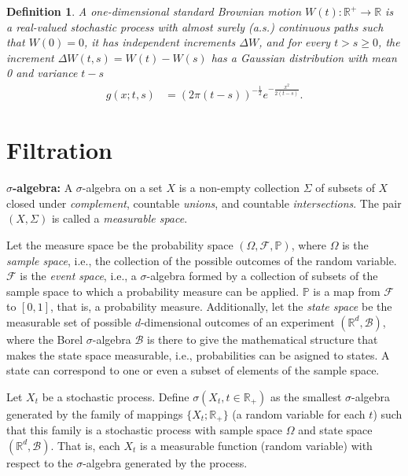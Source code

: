 \documentclass[11pt]{article}
\newtheorem{definition}{Definition}[section]
\begin{document}
\begin{definition}
  A one-dimensional standard {\it Brownian motion} $W(t):\mathbb{R}^+\rightarrow\mathbb{R}$ is a real-valued stochastic process with almost surely (a.s.) continuous paths such that $W(0)=0$, it has independent increments $\Delta W$, and for every $t>s\geq0$, the increment $\Delta W(t,s)=W(t)-W(s)$ has a Gaussian distribution with mean 0 and variance $t-s$
  \begin{align}
    g(x;t,s)&=\left(2\pi(t-s)\right)^{-\frac{1}{2}}e^{-\frac{x^2}{2(t-s)}}.
  \end{align}
\end{definition}


\section{Filtration}
{\bf $\sigma$-algebra:} A $\sigma$-algebra on a set $X$ is a non-empty collection $\Sigma$ of subsets of $X$ closed under {\it complement}, countable {\it unions}, and countable {\it intersections}. The pair $(X,\Sigma)$ is called a {\it measurable space}.

Let the measure space be the probability space $(\Omega,\mathcal{F},\mathbb{P})$, where $\Omega$ is the {\it sample space}, i.e., the collection of the possible outcomes of the random variable. $\mathcal{F}$ is the {\it event space}, i.e., a $\sigma$-algebra formed by a collection of subsets of the sample space to which a probability measure can be applied. $\mathbb{P}$ is a map from $\mathcal{F}$ to $[0,1]$, that is, a probability measure. Additionally, let the {\it state space} be the measurable set of possible $d$-dimensional outcomes of an experiment $(\mathbb{R}^d,\mathcal{B})$, where the Borel $\sigma$-algebra $\mathcal{B}$ is there to give the mathematical structure that makes the state space measurable, i.e., probabilities can be asigned to states. A state can correspond to one or even a subset of elements of the sample space.

Let $X_t$ be a stochastic process. Define $\sigma(X_t,t\in \mathbb{R}_+)$ as the smallest $\sigma$-algebra generated by the family of mappings $\{X_t;\mathbb{R}_+\}$ (a random variable for each $t$) such that this family is a stochastic process with sample space $\Omega$ and state space $(\mathbb{R}^d,\mathcal{B})$. That is, each $X_t$ is a measurable function (random variable) with respect to the $\sigma$-algebra generated by the process.
\end{document}
